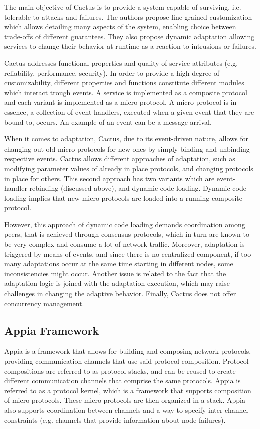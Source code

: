 The main objective of Cactus \cite{Hiltunen1999} is to provide a system capable of surviving, i.e. tolerable to attacks and failures. The authors propose fine-grained customization which allows detailing many aspects of the system, enabling choice between trade-offs of different guarantees. They also propose dynamic adaptation allowing services to change their behavior at runtime as a reaction to intrusions or failures.

Cactus addresses functional properties and quality of service attributes (e.g. reliability, performance, security). In order to provide a high degree of customizability, different properties and functions constitute different modules which interact trough events. A service is implemented as a composite protocol and each variant is implemented as a micro-protocol. A micro-protocol is in essence, a collection of event handlers, executed when a given event that they are bound to, occurs. An example of an event can be a message arrival.

When it comes to adaptation, Cactus, due to its event-driven nature, allows for changing out old micro-protocols for new ones by simply binding and unbinding respective events. Cactus allows different approaches of adaptation, such as modifying parameter values of already in place protocols, and changing protocols in place for others. This second approach has two variants which are event-handler rebinding (discussed above), and dynamic code loading. Dynamic code loading implies that new micro-protocols are loaded into a running composite protocol.

However, this approach of dynamic code loading demands coordination among peers, that is achieved through consensus protocols, which in turn are known to be very complex and consume a lot of network traffic. Moreover, adaptation is triggered by means of events, and since there is no centralized component, if too many adaptations occur at the same time starting in different nodes, some inconsistencies might occur. Another issue is related to the fact that the adaptation logic is joined with the adaptation execution, which may raise challenges in changing the adaptive behavior. Finally, Cactus does not offer concurrency management.
%
%
%
\subsection{Appia Framework}
\label{ssec:appiaframework}

Appia \cite{Miranda2001} is a framework that allows for building and composing network protocols, providing communication channels that use said protocol composition. Protocol compositions are referred to as protocol stacks, and can be reused to create different communication channels that comprise the same protocols. Appia is referred to as a protocol kernel, which is a framework that supports composition of micro-protocols. These micro-protocols are then organized in a stack. Appia also supports coordination between channels and a way to specify inter-channel constraints (e.g. channels that provide information about node failures).


